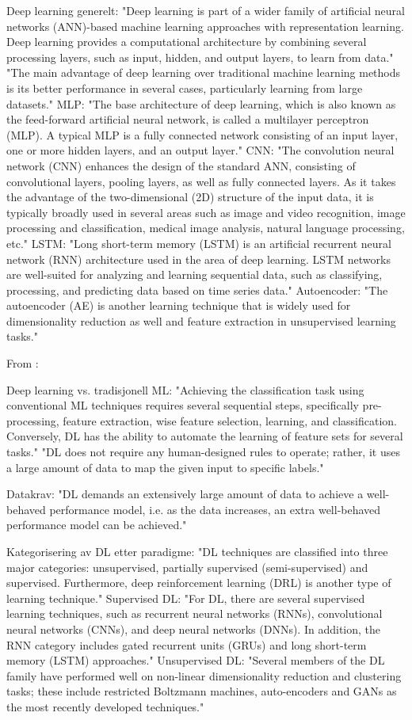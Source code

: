 Deep learning generelt:
"Deep learning is part of a wider family of artificial neural networks (ANN)-based machine learning approaches with representation learning. Deep learning provides a computational architecture by combining several processing layers, such as input, hidden, and output layers, to learn from data."
"The main advantage of deep learning over traditional machine learning methods is its better performance in several cases, particularly learning from large datasets."
MLP:
"The base architecture of deep learning, which is also known as the feed-forward artificial neural network, is called a multilayer perceptron (MLP). A typical MLP is a fully connected network consisting of an input layer, one or more hidden layers, and an output layer."
CNN:
"The convolution neural network (CNN) enhances the design of the standard ANN, consisting of convolutional layers, pooling layers, as well as fully connected layers. As it takes the advantage of the two-dimensional (2D) structure of the input data, it is typically broadly used in several areas such as image and video recognition, image processing and classification, medical image analysis, natural language processing, etc."
LSTM:
"Long short-term memory (LSTM) is an artificial recurrent neural network (RNN) architecture used in the area of deep learning. LSTM networks are well-suited for analyzing and learning sequential data, such as classifying, processing, and predicting data based on time series data."
Autoencoder:
"The autoencoder (AE) is another learning technique that is widely used for dimensionality reduction as well and feature extraction in unsupervised learning tasks."

From \parencite{alzubaidi2021review_deep_learning_concepts}:

Deep learning vs. tradisjonell ML:
"Achieving the classification task using conventional ML techniques requires several sequential steps, specifically pre-processing, feature extraction, wise feature selection, learning, and classification. Conversely, DL has the ability to automate the learning of feature sets for several tasks."
"DL does not require any human-designed rules to operate; rather, it uses a large amount of data to map the given input to specific labels."

Datakrav:
"DL demands an extensively large amount of data to achieve a well-behaved performance model, i.e. as the data increases, an extra well-behaved performance model can be achieved."

Kategorisering av DL etter paradigme:
"DL techniques are classified into three major categories: unsupervised, partially supervised (semi-supervised) and supervised. Furthermore, deep reinforcement learning (DRL) is another type of learning technique."
Supervised DL:
"For DL, there are several supervised learning techniques, such as recurrent neural networks (RNNs), convolutional neural networks (CNNs), and deep neural networks (DNNs). In addition, the RNN category includes gated recurrent units (GRUs) and long short-term memory (LSTM) approaches."
Unsupervised DL:
"Several members of the DL family have performed well on non-linear dimensionality reduction and clustering tasks; these include restricted Boltzmann machines, auto-encoders and GANs as the most recently developed techniques."

